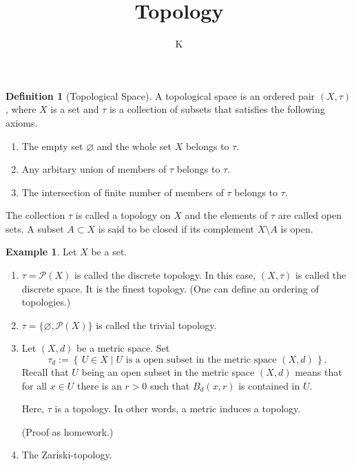 \documentclass[a4paper]{book}
\title{Topology}
\author{K}
\theoremstyle{definition}
\newtheorem{definition}{Definition}[chapter]
\newtheorem{example}{Example}[definition]
\newcommand{\makeset}[2]{\left\{\, #1 \mid #2 \,\right\}}
\begin{document}
\maketitle
\tableofcontents
\begin{definition}[Topological Space]
    A {\color{maththen}topological space} is an ordered pair \((X, \tau)\), where \(X\) is a {\color{mathif}set} and \(\tau\) is a {\color{mathif}collection of subsets} that satisfies the following axioms.
    \begin{enumerate}
        \item The {\color{mathif}empty set} \(\varnothing\) and the {\color{mathif}whole set} \(X\) belongs to \(\tau\).
        \item Any {\color{mathif}arbitary union} of members of \(\tau\) belongs to \(\tau\).
        \item The {\color{mathif}intersection of finite number} of members of \(\tau\) belongs to \(\tau\).
    \end{enumerate}
    The {\color{mathif}collection} \(\tau\) is called a {\color{maththen}topology} on \(X\) and the {\color{mathif}elements} of \(\tau\) are called {\color{maththen}open sets}. A {\color{mathif}subset} \(A \subset X\) is said to be {\color{maththen}closed} if its {\color{mathif}complement} \(X \setminus A\) is {\color{mathif}open}.
\end{definition}


\begin{example}
    Let \(X\) be a set.
    \begin{enumerate}
        \item \(\tau = \mathcal{P}(X)\) is called the {\color{maththen}discrete topology}. In this case, \((X, \tau)\) is called the {\color{maththen}discrete space}. It is the finest topology. (One can define an ordering of topologies.)
        \item \(\tau = \{\varnothing, \mathcal{P}(X)\}\) is called the {\color{maththen}trivial topology}.
        \item Let \((X, d)\) be a {\color{mathif}metric space}. Set
        \begin{equation}
            \tau_d := \makeset{U \in X}{U \text{ is a open subset in the metric space } (X, d)} \text{.}
        \end{equation}
        Recall that \(U\) being an open subset in the metric space \((X, d)\) means that for all \(x \in U\) there is an \(r > 0\) such that \(B_d(x, r)\) is contained in \(U\).

        Here, \(\tau\) is a topology. In other words, a metric induces a topology.

        (Proof as homework.)
        \item The Zariski-topology.
    \end{enumerate}
\end{example}
\end{document}
